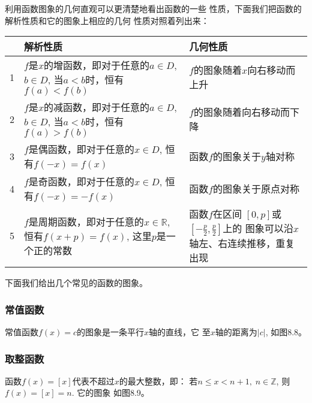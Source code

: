 利用函数图象的几何直观可以更清楚地看出函数的一些
性质，下面我们把函数的解析性质和它的图象上相应的几何
性质对照着列出来：
\begin{center}
\begin{tabular}{cp{}p{}}
    \hline
    &  解析性质  &几何性质\\
    \hline
    1  &$f$是$x$的增函数，即对于任意的$a\in D$, $b\in D$, 当$a<b$时，恒有$f(a)<
f(b)$  &$f$的图象随着$x$向右移动而上升\\
2&$f$是$x$的减函数，即对于任意的$a\in D$, $b\in D$, 当$a<b$时，恒有$f(a)>f(b)$ &$f$的图象随着向右移动而下降\\
3&$f$是偶函数，即对于任意的$x\in D$, 恒有$f(-x)=f(x)$ &函数$f$的图象关于$y$轴对称\\
4& $f$是奇函数，即对于任意的$x\in D$, 恒有$f(-x)=-f(x)$ & 函数$f$的图象关于原点对称\\
5 & $f$是周期函数，即对于任意的$x\in\mathbb{R}$, 恒有$f(x+p)=f(x)$, 这里$p$是一个正的常数& 函数$f$在区间
$[0,p]$或$\left[-\frac{p}{2},\frac{p}{2}\right]$上的
图象可以沿$x$轴左、右连续推移，重复出现\\
\hline
\end{tabular}
\end{center}

下面我们给出几个常见的函数的图象。

\subsubsection{常值函数}
常值函数$f(x)=c$的图象是一条平行$x$轴的直线，它
至$x$轴的距离为$|c|$, 如图8.8。

\subsubsection{取整函数}
函数$f(x)=[x]$代表不超过$x$的最大整数，即：
若$n\le x<n+1,\; n\in\mathbb{Z}$, 则$f(x)=[x]=n$. 它的图象
如图8.9。

